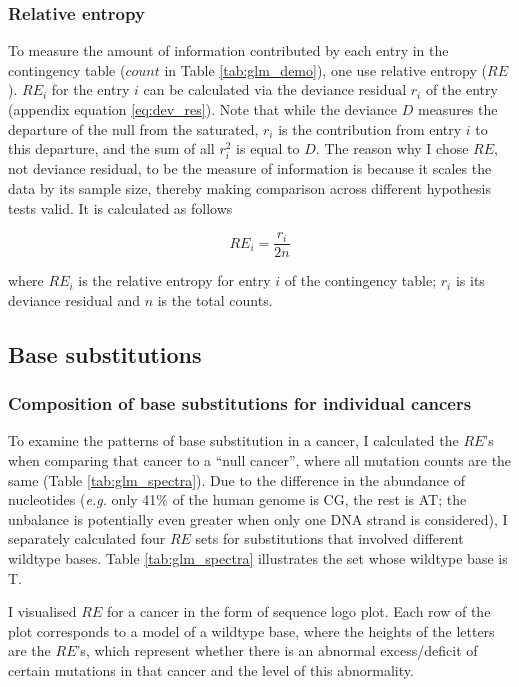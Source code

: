 \subsubsection{Relative entropy}\label{methods:re}
To measure the amount of information contributed by each entry in the contingency table ($count$ in Table \ref{tab:glm_demo}), one use relative entropy ($RE$). $RE_i$ for the entry $i$ can be calculated via the deviance residual $r_i$ of the entry (appendix equation \ref{eq:dev_res}). Note that while the deviance $D$ measures the departure of the null from the saturated, $r_i$ is the contribution from entry $i$ to this departure, and the sum of all $r_i^2$ is equal to $D$. The reason why I chose $RE$, not deviance residual, to be the measure of information is because it scales the data by its sample size, thereby making comparison across different hypothesis tests valid. It is calculated as follows

\begin{equation}
    RE_i = \frac{r_i}{2n} 
    \label{eq:re}
\end{equation}

where $RE_i$ is the relative entropy for entry $i$ of the contingency table; $r_i$ is its deviance residual and $n$ is the total counts. 

\subsection{Base substitutions}\label{methods:spectra}
\subsubsection{Composition of base substitutions for individual cancers}
To examine the patterns of base substitution in a cancer, I calculated the $RE$'s when comparing that cancer to a ``null cancer'', where all mutation counts are the same (Table \ref{tab:glm_spectra}). Due to the difference in the abundance of nucleotides (\textit{e.g.} only 41\% of the human genome is CG, the rest is AT; the unbalance is potentially even greater when only one DNA strand is considered), I separately calculated four $RE$ sets for substitutions that involved different wildtype bases. Table \ref{tab:glm_spectra} illustrates the set whose wildtype base is T. 



I visualised $RE$ for a cancer in the form of sequence logo plot. Each row of the plot corresponds to a model of a wildtype base, where the heights of the letters are the $RE$'s, which represent whether there is an abnormal excess/deficit of certain mutations in that cancer and the level of this abnormality.

